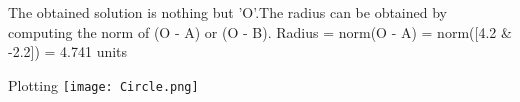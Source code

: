 \documentclass{beamer}
\begin{document}
\begin{frame}
The obtained solution is nothing but 'O'.\newline The radius can be obtained by computing the norm of (O - A) or (O - B).
\newline\newline Radius = norm(O - A) = norm([4.2 & -2.2]) = 4.741 units
\end{frame}

\begin{frame}{Plotting}
\texttt{[image: Circle.png]}  
\end{frame}
\end{document}
